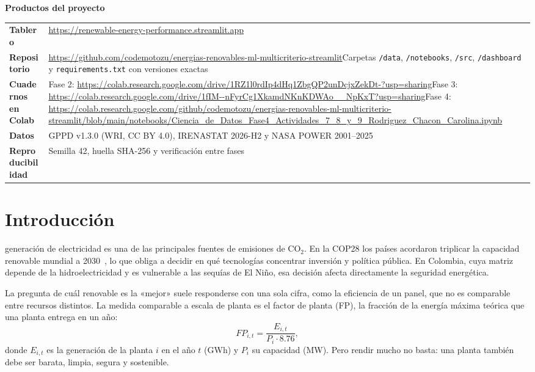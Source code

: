 \documentclass[journal,letterpaper]{IEEEtran}
\newcommand{\enlaceTablero}{\url{https://renewable-energy-performance.streamlit.app}}
\newcommand{\enlaceRepo}{\url{https://github.com/codemotozu/energias-renovables-ml-multicriterio-streamlit}}
\begin{document}
\begin{table}[!t]
\centering
{\small\textbf{Productos del proyecto}}\\[3pt]
\footnotesize
\begin{tabular}{@{}L{2.0cm}L{6.1cm}@{}}
\toprule
\textbf{Tablero} & \enlaceTablero \\
\textbf{Repositorio} & \enlaceRepo\newline Carpetas \texttt{/data}, \texttt{/notebooks}, \texttt{/src}, \texttt{/dashboard} y \texttt{requirements.txt} con versiones exactas \\
\textbf{Cuadernos en Colab} & Fase 2: \url{https://colab.research.google.com/drive/1RZ1l0rdIp4dHq1ZbgQP2unDcjxZekDt-?usp=sharing}\newline Fase 3: \url{https://colab.research.google.com/drive/1fIM--nFyrCg1XkamdNKnKDWAo__NpKxT?usp=sharing}\newline Fase 4: \url{https://colab.research.google.com/github/codemotozu/energias-renovables-ml-multicriterio-streamlit/blob/main/notebooks/Ciencia_de_Datos_Fase4_Actividades_7_8_y_9_Rodriguez_Chacon_Carolina.ipynb} \\
\textbf{Datos} & GPPD v1.3.0 (WRI, CC BY 4.0), IRENASTAT 2026-H2 y NASA POWER 2001--2025 \\
\textbf{Reproducibilidad} & Semilla 42, huella SHA-256 y verificación entre fases \\
\bottomrule
\end{tabular}
\end{table}

\section{Introducción}
 generación de electricidad es una de las principales fuentes de emisiones de CO$_2$. En la COP28 los países acordaron triplicar la capacidad renovable mundial a 2030~\cite{unfccc2023}, lo que obliga a decidir en qué tecnologías concentrar inversión y política pública. En Colombia, cuya matriz depende de la hidroelectricidad y es vulnerable a las sequías de El Niño, esa decisión afecta directamente la seguridad energética.

La pregunta de cuál renovable es la «mejor» suele responderse con una sola cifra, como la eficiencia de un panel, que no es comparable entre recursos distintos. La medida comparable a escala de planta es el factor de planta (FP), la fracción de la energía máxima teórica que una planta entrega en un año:
\begin{equation}
FP_{i,t} = \frac{E_{i,t}}{P_i \cdot 8.76},
\end{equation}
donde $E_{i,t}$ es la generación de la planta $i$ en el año $t$ (GWh) y $P_i$ su capacidad (MW). Pero rendir mucho no basta: una planta también debe ser barata, limpia, segura y sostenible.
\end{document}

